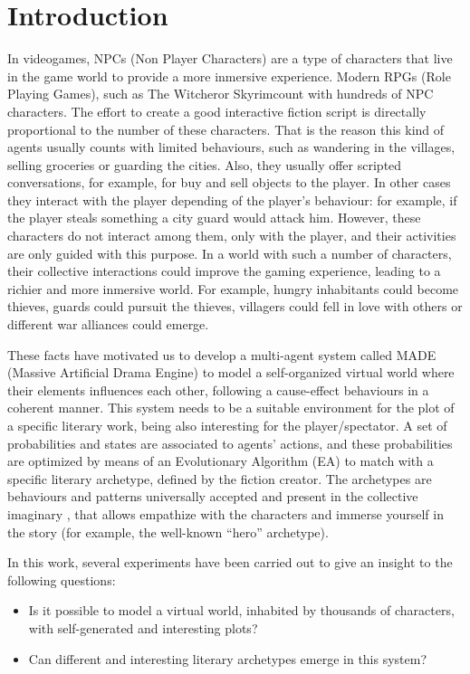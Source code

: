 \documentclass[final,1p,times]{elsarticle}
\begin{document}
\section{Introduction}
\label{sec:intro}


In videogames, NPCs (Non Player Characters) are a type of characters that live in the game world to provide a more inmersive experience. Modern RPGs (Role Playing Games), such as The Witcher\texttrademark or Skyrim\texttrademark count with hundreds of NPC characters. The effort to create a good interactive fiction script is directally proportional to the number of these characters. That is the reason this kind of agents usually counts with limited behaviours, such as wandering in the villages, selling groceries or guarding the cities. Also, they usually offer scripted conversations, for example, for buy and sell objects to the player. In other cases they interact with the player depending of the player's behaviour: for example, if the player steals something a city guard would attack him.  However, these characters do not interact among them, only with the player, and their activities are only guided with this purpose. In a world with such a number of characters, their collective interactions could improve the gaming experience, leading to a richier and more inmersive world. For example, hungry inhabitants could become thieves, guards could pursuit the thieves, villagers could fell in love with others or different war alliances could emerge.

These facts have motivated us to develop a multi-agent system called MADE (Massive Artificial Drama Engine) to model a self-organized virtual world where their elements influences each other, following a cause-effect behaviours in a coherent manner. This system needs to be a suitable environment for the plot of a specific literary work, being also interesting for the player/spectator. A set of probabilities and states are associated to agents' actions, and these probabilities are optimized by means of an Evolutionary Algorithm (EA) to match with a specific literary archetype, defined by the fiction creator. The archetypes are behaviours and patterns universally accepted and present in the collective imaginary \cite{ArchetypesGarry05}, that allows empathize with the characters and immerse yourself in the story (for example, the well-known ``hero'' archetype).

In this work, several experiments have been carried out to give an insight to the following questions:
\begin{itemize}
 \item Is it possible to model a virtual world, inhabited by thousands of characters, with self-generated and interesting plots?
 \item Can different and interesting literary archetypes emerge in this system?
\end{itemize}
\end{document}

